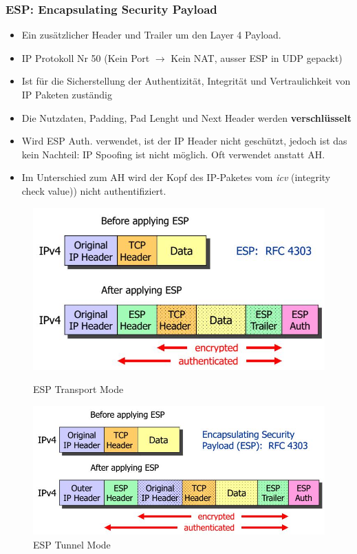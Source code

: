 \subsubsection{ESP: Encapsulating Security Payload}
\begin{itemize}
	\item Ein zusätzlicher Header und Trailer um den Layer 4 Payload.
	\item IP Protokoll Nr 50 (Kein Port $\rightarrow$ Kein NAT, ausser ESP in UDP gepackt)
	\item Ist für die Sicherstellung der Authentizität, Integrität und Vertraulichkeit von IP Paketen zuständig
	\item Die Nutzdaten, Padding, Pad Lenght und Next Header werden \textbf{verschlüsselt}
	\item Wird ESP Auth. verwendet, ist der IP Header nicht geschützt, jedoch ist das kein Nachteil: IP Spoofing ist nicht möglich. Oft verwendet anstatt AH.
	\item Im Unterschied zum AH wird der Kopf des IP-Paketes vom \textit{icv} (integrity check value)) nicht authentifiziert.
\end{itemize}

\begin{figure}[ht!]
    \centering
	\begin{minipage}[t]{0.45\textwidth}
        \includegraphics[width=\linewidth]{images/ipsec_esp}
        \caption{ESP Transport Mode}
    \end{minipage}
	\begin{minipage}[t]{0.5\textwidth}
        \includegraphics[width=\linewidth]{images/ipsec_esp_tunnel}
        \caption{ESP Tunnel Mode}
    \end{minipage}
\end{figure}


